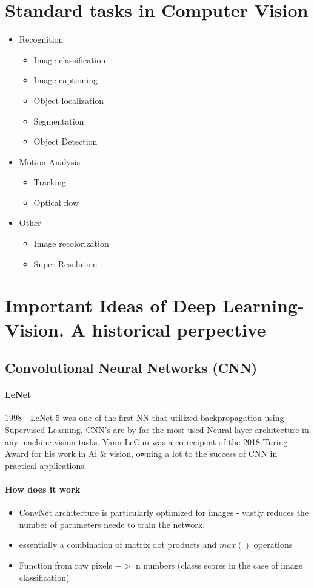 \documentclass{article}
\begin{document}
	\section{Standard tasks in Computer Vision}
	\begin{itemize}
		\item Recognition
		\begin{itemize}
			\item Image classification
			\item Image captioning
			\item Object localization
			\item Segmentation
			\item Object Detection
		\end{itemize}
		\item Motion Analysis
		\begin{itemize}
			\item Tracking
			\item Optical flow
		\end{itemize}
		\item Other
		\begin{itemize}
			\item Image recolorization
			\item Super-Resolution
		\end{itemize}
	
	\end{itemize}
	\section{Important Ideas of Deep Learning-Vision. A historical perpective}
	
	\subsection{Convolutional Neural Networks (CNN)}
		\paragraph{LeNet}
			1998 - LeNet-5 was one of the first NN that utilized backpropagation using Supervised Learning. CNN's are by far the most used Neural layer architecture in any machine vision tasks. Yann LeCun was a co-recipent of the 2018 Turing Award for his work in Ai \& vision, owning a lot to the success of CNN in practical applications.
			
		\paragraph{How does it work}
		\begin{itemize}
			\item ConvNet architecture is particularly optimized for images - vastly reduces the number of parameters neede to train the network.
			\item essentially a combination of matrix dot products and $max()$ operations 
			\item Function from raw pixels $->$ n numbers (classs scores in the case of image classification) 
			
		\end{itemize}
			
\end{document}
